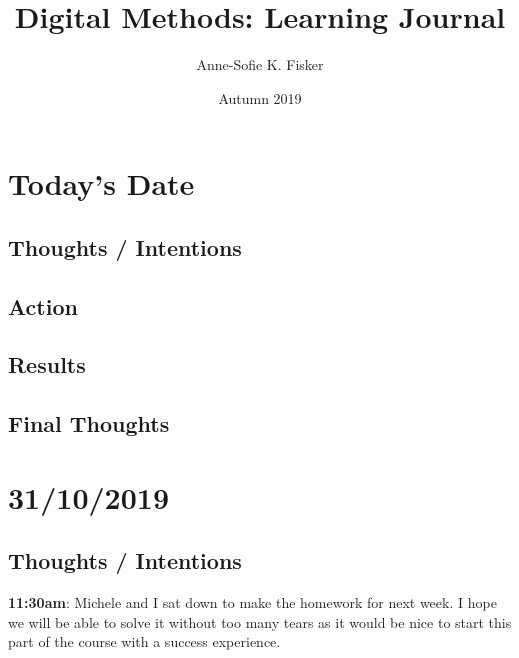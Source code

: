 \documentclass{article}
\title{Digital Methods: Learning Journal}
\author{Anne-Sofie K. Fisker}
\date{Autumn 2019}
\begin{document}
\maketitle

\section{Today's Date}
\subsection{Thoughts / Intentions}
\subsection{Action}
\subsection{Results}
\subsection{Final Thoughts}

\pagebreak{}

\section{31/10/2019}
\subsection{Thoughts / Intentions}

\textbf{11:30am}: Michele and I sat down to make the homework for next week. I hope we will be able to solve it without too many tears as it would be nice to start this part of the course with a success experience.
\end{document}
